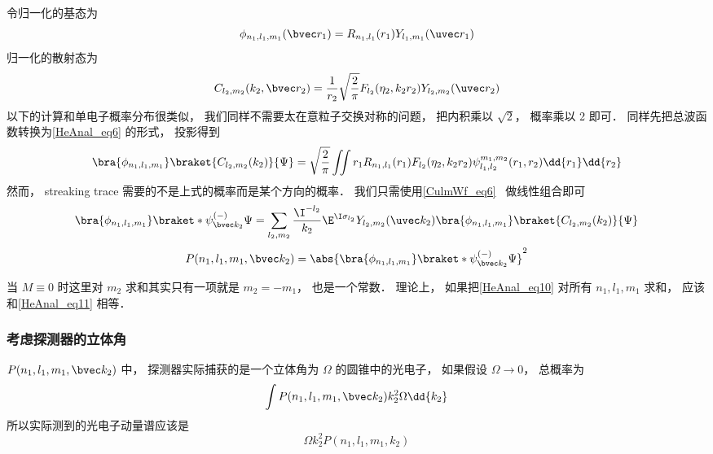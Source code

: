 令归一化的基态为
\begin{equation}
\phi_{n_1, l_1, m_1}(\bvec r_1) = R_{n_1,l_1}(r_1)Y_{l_1,m_1}(\uvec r_1)
\end{equation}
归一化的散射态为
\begin{equation}
C_{l_2, m_2}(k_2, \bvec r_2) = \frac{1}{r_2}\sqrt{\frac{2}{\pi}} F_{l_2}(\eta_2, k_2 r_2) Y_{l_2, m_2} (\uvec r_2)
\end{equation}
以下的计算和单电子概率分布很类似， 我们同样不需要太在意粒子交换对称的问题， 把内积乘以 $\sqrt{2}$， 概率乘以 2 即可． 同样先把总波函数转换为\autoref{HeAnal_eq6} 的形式， 投影得到
\begin{equation}\label{HeAnal_eq36}
\bra{\phi_{n_1, l_1, m_1}}\braket{C_{l_2, m_2}(k_2)}{\Psi} = \sqrt{\frac{2}{\pi}} \iint r_1 R_{n_1,l_1}(r_1) F_{l_2}(\eta_2, k_2 r_2) \psi_{l_1, l_2}^{m_1, m_2}(r_1, r_2) \dd{r_1} \dd{r_2}
\end{equation}
然而， streaking trace 需要的不是上式的概率而是某个方向的概率． 我们只需使用\autoref{CulmWf_eq6}~ 做线性组合即可
\begin{equation}
\bra{\phi_{n_1, l_1, m_1}}\braket*{\psi_{\bvec k_2}^{(-)}}{\Psi} = \sum_{l_2,m_2} \frac{\I^{-l_2}}{k_2} \E^{\I\sigma_{l_2}} Y_{l_2,m_2}(\uvec k_2) \bra{\phi_{n_1, l_1, m_1}}\braket{C_{l_2, m_2}(k_2)}{\Psi} 
\end{equation}
\begin{equation}\label{HeAnal_eq10}
P(n_1, l_1, m_1, \bvec k_2) = \abs{\bra{\phi_{n_1, l_1, m_1}}\braket*{\psi_{\bvec k_2}^{(-)}}{\Psi}}^2
\end{equation}

当 $M \equiv 0$ 时这里对 $m_2$ 求和其实只有一项就是 $m_2 = - m_1$， 也是一个常数． 理论上， 如果把\autoref{HeAnal_eq10} 对所有 $n_1, l_1, m_1$ 求和， 应该和\autoref{HeAnal_eq11} 相等．


\subsubsection{考虑探测器的立体角}
$P(n_1, l_1, m_1, \bvec k_2)$ 中， 探测器实际捕获的是一个立体角为 $\Omega$ 的圆锥中的光电子， 如果假设 $\Omega \to 0$， 总概率为
\begin{equation}
\int P(n_1, l_1, m_1, \bvec k_2) k_2^2 \Omega \dd{k_2}
\end{equation}
所以实际测到的光电子动量谱应该是
\begin{equation}
\Omega k_2^2 P(n_1, l_1, m_1, k_2)
\end{equation}


